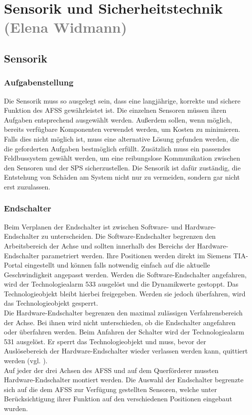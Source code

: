 \section{Sensorik und Sicherheitstechnik \textcolor{gray}{(Elena Widmann)}}
\label{sec:Sensorik und Sicherheitstechnik}

\subsection{Sensorik}
\label{sec:Sensorik}
\subsubsection{Aufgabenstellung}
Die Sensorik muss so ausgelegt sein, dass eine langjährige, korrekte und sichere Funktion des AFSS gewährleistet ist. Die einzelnen Sensoren müssen ihren Aufgaben entsprechend ausgewählt werden. Außerdem sollen, wenn möglich, bereits verfügbare Komponenten verwendet werden, um Kosten zu minimieren. Falls dies nicht möglich ist, muss eine alternative Lösung gefunden werden, die die geforderten Aufgaben bestmöglich erfüllt. Zusätzlich muss ein passendes Feldbussystem gewählt werden, um eine reibungslose Kommunikation zwischen den Sensoren und der SPS sicherzustellen. Die Sensorik ist dafür zuständig, die Entstehung von Schäden am System nicht nur zu vermeiden, sondern gar nicht erst zuzulassen.

\subsubsection{Endschalter}
Beim Verplanen der Endschalter ist zwischen Software- und Hardware-Endschalter zu unterscheiden. Die Software-Endschalter begrenzen den Arbeitsbereich der Achse und sollten innerhalb des Bereichs der Hardware-Endschalter parametriert werden. Ihre Positionen werden direkt im Siemens TIA-Portal eingestellt und können falls notwendig einfach auf die aktuelle Geschwindigkeit angepasst werden. Werden die Software-Endschalter angefahren, wird der Technologiealarm 533 ausgelöst und die Dynamikwerte gestoppt. Das Technologieobjekt bleibt hierbei freigegeben. Werden sie jedoch überfahren, wird das Technologieobjekt gesperrt. \\
Die Hardware-Endschalter begrenzen den maximal zulässigen Verfahrensbereich der Achse. Bei ihnen wird nicht unterschieden, ob die Endschalter angefahren oder überfahren werden. Beim Anfahren der Schalter wird der Technologiealarm 531 ausgelöst. Er sperrt das Technologieobjekt und muss, bevor der Auslösebereich der Hardware-Endschalter wieder verlassen werden kann, quittiert werden (vgl. \cite{axis_manual}).\\
Auf jeder der drei Achsen des AFSS und auf dem Querförderer mussten Hardware-Endschalter montiert werden. Die Auswahl der Endschalter begrenzte sich auf die dem AFSS zur Verfügung gestellten Sensoren, welche unter Berücksichtigung ihrer Funktion auf den verschiedenen Positionen eingebaut wurden.


